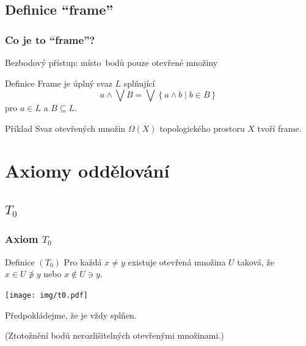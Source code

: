 \documentclass[mathserif]{beamer}
\begin{document}

\subsection{Definice ``frame''}

\begin{frame}
\frametitle{Co je to ``frame''?}
Bezbodový přístup: místo~bodů pouze \alert{otevřené množiny}
\pause

\begin{block}{Definice}
  {\color{blue}Frame} je úplný svaz $L$ splňující
  \begin{equation*}%
    a \wedge \bigvee B
    = \bigvee \left\{ a \wedge b \mid b \in B \right\}
  \end{equation*}
  pro $a \in L$ a $B \subseteq L$.
\end{block}
\pause

\begin{exampleblock}{Příklad}
  Svaz otevřených množin $\Omega(X)$ topologického prostoru $X$ tvoří frame.
\end{exampleblock}
\end{frame}

\section{Axiomy oddělování}

\subsection{$T_0$} %

\begin{frame}
\frametitle{Axiom $T_0$}

\begin{block}{Definice $(T_0)$}
  Pro každá $x \ne y$ existuje otevřená množina $U$ taková, že $x \in U
  \not\owns y$ nebo $x \not\in U \ni y$.
\end{block}

\begin{center}
  \texttt{[image: img/t0.pdf]}
\end{center}
\pause

Předpokládejme, že je \alert{vždy splňen}.

(Ztotožnění bodů nerozlišitelných otevřenými množinami.)

\end{frame}
\end{document}
